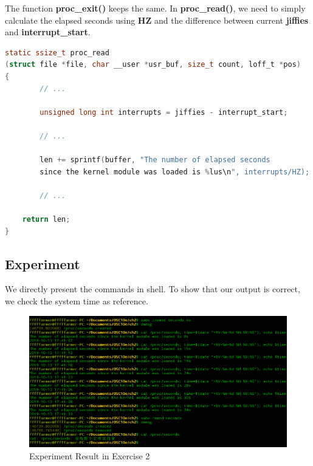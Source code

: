 \documentclass{article}
\begin{document}
    The function \textbf{proc\_exit()} keeps the same. In \textbf{proc\_read()}, we need to simply calculate the elapsed seconds using \textbf{HZ} and the difference between current \textbf{jiffies} and \textbf{interrupt\_start}.

    \vspace{2pt}

    \begin{lstlisting}[language=c, caption={\textbf{proc\_read()}}]
static ssize_t proc_read
(struct file *file, char __user *usr_buf, size_t count, loff_t *pos)
{
        // ...

        unsigned long int interrupts = jiffies - interrupt_start;

        // ...

        len += sprintf(buffer, "The number of elapsed seconds 
        since the kernel module was loaded is %lus\n", interrupts/HZ);

        // ...

	return len;
}
    \end{lstlisting}

    \subsection*{Experiment}
    We directly present the commands in shell. To show that our output is correct, we check the system time as reference.

    \begin{figure}[h]
        \centering
        
        \includegraphics[width=17cm]{seconds}
        \caption{Experiment Result in Exercise 2}
        \label{}
    \end{figure}
\end{document}
